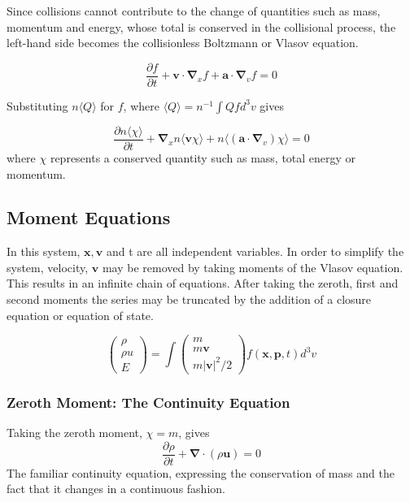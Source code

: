 Since collisions cannot contribute to the change of quantities such as mass,
momentum and energy, whose total is conserved in the collisional process, the
left-hand side becomes the collisionless Boltzmann or Vlasov equation.

\begin{equation}
\frac{\partial{f}}{\partial{t}}
+
\mathbf{v}
\cdot
{\boldsymbol{\nabla}}_x f
+
%
\mathbf{a}
\cdot
{\boldsymbol{\nabla}}_v f
=0
\end{equation}

Substituting $n \langle Q \rangle $ for $f$, where $ \langle Q \rangle = n^{-1} \int Q f d^3v $
gives

\begin{equation}
\frac{\partial{ n \langle \chi \rangle }}{\partial{t}}
+
 {\boldsymbol{\nabla}}_x n{\langle \mathbf{v} \chi \rangle}
+
n
\langle
\left(
\mathbf{a} \cdot
{\boldsymbol{\nabla}}_v
\right)  { \chi }
\rangle
=0
\end{equation}
where $\chi$ represents a conserved quantity such as mass, total energy or momentum.

\subsection{Moment Equations}
In this system, $\mathbf{x},\mathbf{v}$ and t are all independent variables.
In order to simplify the system, velocity, $\mathbf{v}$ may be removed by taking moments of the Vlasov equation.
This results in an infinite chain of equations.
After taking the zeroth, first and second moments the series may be truncated by the addition of a closure equation or equation of state.

\begin{equation}
\left( 
\begin{array}{c}
\rho \\
\rho u \\
E 
\end{array}
\right) 
=
\int
{
\left( 
\begin{array}{c}
m \\
m\mathbf{v} \\
m\left| \mathbf{v} \right| ^2 /2
\end{array}
\right) 
f(\mathbf{x},\mathbf{p},t)
}
d^3v
\end{equation}

\subsubsection{Zeroth Moment: The Continuity Equation}
Taking the zeroth moment, $\chi = m $, gives 
\begin{equation}
\frac{\partial \rho}{\partial t}+\boldsymbol{\nabla}\cdot(\rho \mathbf u)=0
\end{equation}
The familiar continuity equation, expressing the conservation of mass and the fact that it changes in a continuous fashion.


